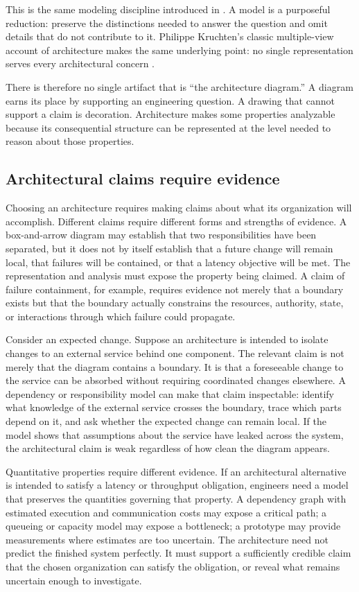 This is the same modeling discipline introduced in \citet{ch-specification}. A model is a purposeful
reduction: preserve the distinctions needed to answer the question and omit details that do not
contribute to it. Philippe Kruchten's classic multiple-view account of architecture makes the same
underlying point: no single representation serves every architectural concern \citep{kruchten1995}.

There is therefore no single artifact that is ``the architecture diagram.'' A diagram earns its
place by supporting an engineering question. A drawing that cannot support a claim is decoration.
Architecture makes some properties analyzable because its consequential structure can be
represented at the level needed to reason about those properties.

\subsection{Architectural claims require evidence}\label{sec-claim-strengths}

Choosing an architecture requires making claims about what its organization will accomplish.
Different claims require different forms and strengths of evidence.
A box-and-arrow diagram may establish that two responsibilities have been separated, but it does not by itself establish that a future change will remain local, that failures will be contained, or that a latency objective will be met.
The representation and analysis must expose the property being claimed.
A claim of failure containment, for example, requires evidence not merely that a boundary exists but that the boundary actually constrains the resources, authority, state, or interactions through which failure could propagate.

Consider an expected change.
Suppose an architecture is intended to isolate changes to an external service behind one component.
The relevant claim is not merely that the diagram contains a boundary.
It is that a foreseeable change to the service can be absorbed without requiring coordinated changes elsewhere.
A dependency or responsibility model can make that claim inspectable: identify what knowledge of the external service crosses the boundary, trace which parts depend on it, and ask whether the expected change can remain local.
If the model shows that assumptions about the service have leaked across the system, the architectural claim is weak regardless of how clean the diagram appears.

Quantitative properties require different evidence.
If an architectural alternative is intended to satisfy a latency or throughput obligation, engineers need a model that preserves the quantities governing that property.
A dependency graph with estimated execution and communication costs may expose a critical path; a queueing or capacity model may expose a bottleneck; a prototype may provide measurements where estimates are too uncertain.
The architecture need not predict the finished system perfectly.
It must support a sufficiently credible claim that the chosen organization can satisfy the obligation, or reveal what remains uncertain enough to investigate.

